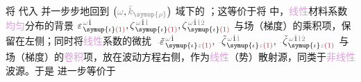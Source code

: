 \clearpage

将  代入  并一步步地回到 $\left( \mathcolor{gray}{\omega}, \mathcolor{gray}{\bar{k}_{\symup{\rho}}} \right)$ 域下的 ；这等价于将  中，\textcolor{Plum}{线性}材料系数\textcolor{Plum}{均匀}分布的背景 $\varepsilon^{\;\! \mathcolor{gray}{\omega} \hat{1}}_{\;\! \symup{\iota} \textcolor{Maroon}{(1)}}, \zeta^{\;\! \mathcolor{gray}{\omega} \hat{1} \mathcolor{gray}{\check{1}}}_{\;\! \symup{\iota} \textcolor{Maroon}{(1)}}, \zeta^{\;\! \mathcolor{gray}{\omega} \hat{1} \mathcolor{gray}{\check{1} \check{2}}}_{\;\! \symup{\iota} \textcolor{Maroon}{(1)}}$ 与场（梯度）的乘积项，保留在左侧；同时将\textcolor{Plum}{线性}系数的\textcolor{NavyBlue}{微扰} $\Xint{\begin{smallmatrix} ~ \\ {}^{}_{\mathcolor{gray}{-}} \\ ~ \end{smallmatrix}}{16}{\tilde{\varepsilon}}^{\;\! \mathcolor{gray}{\omega} \hat{1}}_{\;\! \symup{\iota} \mathcolor{gray}{z} \textcolor{Maroon}{(1)}}, \Xint{\begin{smallmatrix} ~ \\ {}^{}_{\mathcolor{gray}{-}} \\ ~ \end{smallmatrix}}{12}{\tilde{\zeta}}^{\;\! \mathcolor{gray}{\omega} \hat{1} \mathcolor{gray}{\check{1}}}_{\;\! \symup{\iota} \mathcolor{gray}{z} \textcolor{Maroon}{(1)}}, \Xint{\begin{smallmatrix} ~ \\ {}^{}_{\mathcolor{gray}{-}} \\ ~ \end{smallmatrix}}{12}{\tilde{\zeta}}^{\;\! \mathcolor{gray}{\omega} \hat{1} \mathcolor{gray}{\check{1} \check{2}}}_{\;\! \symup{\iota} \mathcolor{gray}{z} \textcolor{Maroon}{(1)}}$ 与场（梯度）的\textcolor{Plum}{卷积}项，放在波动方程右侧，作为\textcolor{Plum}{线性}（势）散射源\cite{bornPrinciplesOptics60th2019,gerkeAperiodicVolumeOptics2010}，同类于\textcolor{Plum}{非线性}\textcolor{NavyBlue}{波源}。于是  进一步等价于
